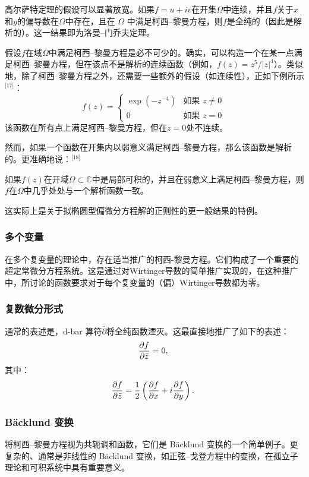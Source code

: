 高尔萨特定理的假设可以显著放宽。如果\( f = u + iv \)在开集\( \Omega \)中连续，并且\( f \)关于\( x \)和\( y \)的偏导数在\( \Omega \)中存在，且在 \( \Omega \) 中满足柯西–黎曼方程，则\( f \)是全纯的（因此是解析的）。这一结果即为洛曼–门乔夫定理。

假设\( f \)在域\( \Omega \)中满足柯西–黎曼方程是必不可少的。确实，可以构造一个在某一点满足柯西–黎曼方程，但在该点不是解析的连续函数（例如，\( f(z)=z^5/|z|^4\)）。类似地，除了柯西–黎曼方程之外，还需要一些额外的假设（如连续性），正如下例所示\(^\text{[17]}\)：
\[
f(z) = 
\begin{cases} 
\exp(-z^{-4}) & \text{如果 } z \neq 0 \\
0 & \text{如果 } z = 0
\end{cases}~
\]
该函数在所有点上满足柯西–黎曼方程，但在\( z = 0 \)处不连续。

然而，如果一个函数在开集内以弱意义满足柯西–黎曼方程，那么该函数是解析的。更准确地说：\(^\text{[18]}\)

如果\( f(z) \)在开域\( \Omega \subset \mathbb{C} \)中是局部可积的，并且在弱意义上满足柯西–黎曼方程，则\( f \)在\( \Omega \)中几乎处处与一个解析函数一致。

这实际上是关于拟椭圆型偏微分方程解的正则性的更一般结果的特例。
\subsubsection{多个变量}
在多个复变量的理论中，存在适当推广的柯西-黎曼方程。它们构成了一个重要的超定常微分方程系统。这是通过对Wirtinger导数的简单推广实现的，在这种推广中，所讨论的函数要求对于每个复变量的（偏）Wirtinger导数都为零。
\subsubsection{复数微分形式}
通常的表述是，d-bar 算符\({\displaystyle {\bar {\partial }}}\)将全纯函数湮灭。这最直接地推广了如下的表述：
\[
{\displaystyle {\partial f \over \partial {\bar {z}}}=0,}~
\]
其中：
\[
{\displaystyle {\partial f \over \partial {\bar {z}}}={1 \over 2}\left({\partial f \over \partial x}+i{\partial f \over \partial y}\right).}~
\]
\subsubsection{Bäcklund 变换 } 
将柯西–黎曼方程视为共轭调和函数，它们是 Bäcklund 变换的一个简单例子。更复杂的、通常是非线性的 Bäcklund 变换，如正弦–戈登方程中的变换，在孤立子理论和可积系统中具有重要意义。
